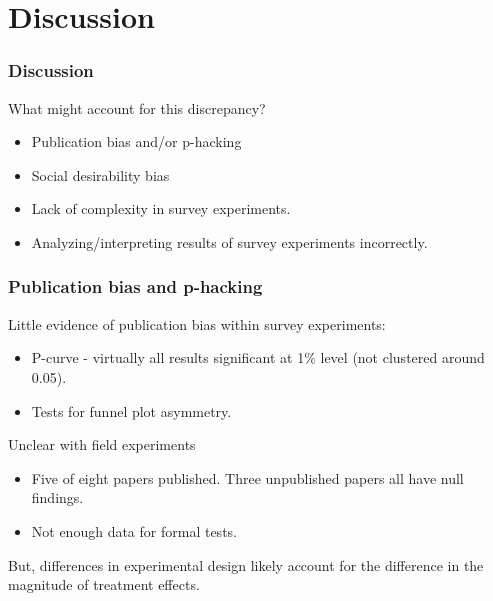 \documentclass[usenames,dvipsnames]{beamer}
\begin{document}
\section{Discussion}

\begin{frame}
\frametitle{Discussion}
What might account for this discrepancy?
\pause
\begin{itemize}
\item Publication bias and/or p-hacking
\pause
\item Social desirability bias
\pause
\item Lack of complexity in survey experiments.
\pause
\item Analyzing/interpreting results of survey experiments incorrectly. 
\end{itemize}

\end{frame}


\begin{frame}
\frametitle{Publication bias and p-hacking}
\textcolor{Cerulean}{Little evidence of publication bias} within survey experiments:
\pause
\begin{itemize}
\item P-curve - virtually all results significant at 1\% level (not clustered around 0.05).
\pause
\item Tests for funnel plot asymmetry. 
\end{itemize}
\pause
Unclear with field experiments
\begin{itemize}
\item Five of eight papers published. Three unpublished papers all have null findings. 
\pause
\item Not enough data for formal tests. 
\end{itemize}
\pause
But, \textcolor{Cerulean}{differences in experimental design} likely account for the difference in the magnitude of treatment effects.

\end{frame}
\end{document}
